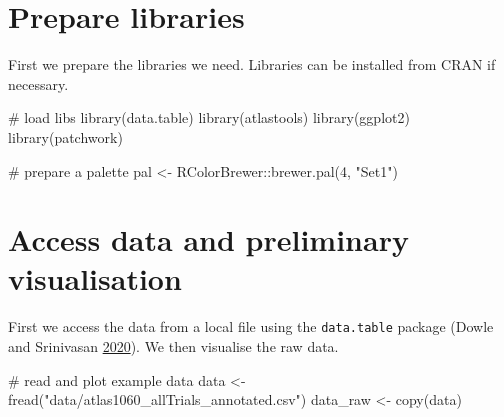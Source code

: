 \documentclass[]{scrreprt}
\newenvironment{Shaded}{}{}
\newcommand{\CommentTok}[1]{\textcolor[rgb]{0.00,0.50,0.00}{#1}}
\newcommand{\DecValTok}[1]{#1}
\newcommand{\KeywordTok}[1]{\textcolor[rgb]{0.00,0.00,1.00}{#1}}
\newcommand{\NormalTok}[1]{#1}
\newcommand{\OperatorTok}[1]{#1}
\newcommand{\StringTok}[1]{\textcolor[rgb]{0.00,0.50,0.50}{#1}}
\begin{document}
\hypertarget{prepare-libraries}{%
\section{Prepare libraries}\label{prepare-libraries}}

First we prepare the libraries we need. Libraries can be installed from CRAN if necessary.

\begin{Shaded}
\begin{Highlighting}[]
\CommentTok{# load libs}
\KeywordTok{library}\NormalTok{(data.table)}
\KeywordTok{library}\NormalTok{(atlastools)}
\KeywordTok{library}\NormalTok{(ggplot2)}
\KeywordTok{library}\NormalTok{(patchwork)}

\CommentTok{# prepare a palette}
\NormalTok{pal <-}\StringTok{ }\NormalTok{RColorBrewer}\OperatorTok{::}\KeywordTok{brewer.pal}\NormalTok{(}\DecValTok{4}\NormalTok{, }\StringTok{"Set1"}\NormalTok{)}
\end{Highlighting}
\end{Shaded}

\hypertarget{access-data-and-preliminary-visualisation}{%
\section{Access data and preliminary visualisation}\label{access-data-and-preliminary-visualisation}}

First we access the data from a local file using the \texttt{data.table} package (Dowle and Srinivasan \protect\hyperlink{ref-dowle2020}{2020}).
We then visualise the raw data.

\begin{Shaded}
\begin{Highlighting}[]
\CommentTok{# read and plot example data}
\NormalTok{data <-}\StringTok{ }\KeywordTok{fread}\NormalTok{(}\StringTok{"data/atlas1060_allTrials_annotated.csv"}\NormalTok{)}
\NormalTok{data_raw <-}\StringTok{ }\KeywordTok{copy}\NormalTok{(data)}
\end{Highlighting}
\end{Shaded}
\end{document}

